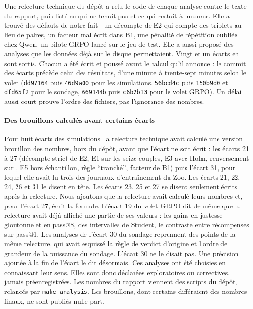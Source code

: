 Une relecture technique du dépôt a relu le code de chaque analyse contre le
texte du rapport, puis listé ce qui ne tenait pas et ce qui restait à mesurer. Elle a trouvé des
défauts de notre fait : un décompte de E2 qui compte des triplets au lieu de paires, un facteur mal
écrit dans B1, une pénalité de répétition oubliée chez Qwen, un pilote GRPO lancé sur le jeu de test.
Elle a aussi proposé des analyses que les données déjà sur le disque permettaient. Vingt et un écarts
en sont sortis. Chacun a été écrit et poussé avant le calcul qu'il annonce : le commit des écarts
précède celui des résultats, d'une minute à trente-sept minutes selon le volet (\texttt{dd97164}
puis \texttt{46d9a00} pour les simulations, \texttt{56bcd4c} puis \texttt{150b9d0} et
\texttt{dfd65f2} pour le sondage, \texttt{669144b} puis \texttt{c6b2b13} pour le volet GRPO). Un
délai aussi court prouve l'ordre des fichiers, pas l'ignorance des nombres.

\paragraph{Des brouillons calculés avant certains écarts} Pour huit écarts des simulations, la relecture technique avait calculé une version brouillon des
nombres, hors du dépôt, avant que l'écart ne soit écrit : les écarts 21 à 27 (décompte strict de E2,
E1 sur les seize couples, E3 avec Holm, renversement sur , E5 hors échantillon, règle \enquote{tranché}, facteur de B1) puis l'écart 31, pour lequel elle avait lu trois des journaux
d'entraînement du Zoo. Les écarts 21, 22, 24, 26 et 31 le disent en tête. Les écarts 23, 25 et 27 se disent seulement écrits après la relecture. Nous ajoutons que la relecture avait calculé leurs nombres et, pour l'écart 27, écrit la formule. L'écart 19 du volet GRPO dit de même que
la relecture avait déjà affiché une partie de ses valeurs : les gains en justesse gloutonne et en
pass@8, des intervalles de Student, le contraste entre récompenses sur pass@1. Les analyses de
l'écart 30 du sondage reprennent des points de la même relecture, qui avait esquissé la règle de
verdict d'origine et l'ordre de grandeur de la puissance du sondage. L'écart 30 ne le disait pas. Une précision ajoutée à la fin de l'écart le dit désormais. Ces analyses ont été choisies en connaissant leur sens. Elles sont donc déclarées
exploratoires ou correctives, jamais préenregistrées. Les nombres du rapport viennent des scripts
du dépôt, relancés par \texttt{make analysis}. Les brouillons, dont certains différaient des nombres
finaux, ne sont publiés nulle part.

